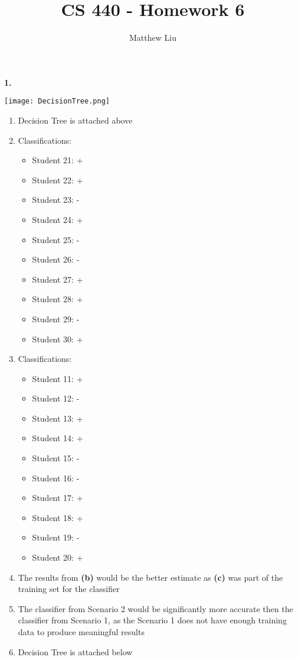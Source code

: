 \documentclass[titlepage]{article}
\title{CS 440 - Homework 6}
\author{Matthew Liu}
\date{}
\begin{document}
\maketitle{}

\noindent \textbf{1. } \\

\centerline{\texttt{[image: DecisionTree.png]}}

\pagebreak

\begin{enumerate}[label=(\alph*)]
	\item Decision Tree is attached above
	\item Classifications:
	\begin{itemize}
		\item Student 21: +
		\item Student 22: +
		\item Student 23: -
		\item Student 24: +
		\item Student 25: -
		\item Student 26: -
		\item Student 27: +
		\item Student 28: +
		\item Student 29: -
		\item Student 30: +
	\end{itemize}
	\item Classifications:
	\begin{itemize}
		\item Student 11: +
		\item Student 12: -
		\item Student 13: +
		\item Student 14: +
		\item Student 15: -
		\item Student 16: -
		\item Student 17: +
		\item Student 18: +
		\item Student 19: -
		\item Student 20: +
	\end{itemize}
	\item The results from \textbf{(b)} would be the better estimate as \textbf{(c)} was part of the training set for the classifier
	\item The classifier from Scenario 2 would be significantly more accurate then the classifier from Scenario 1, as the Scenario 1 does not have enough training data to produce meaningful results
	\item Decision Tree is attached below
\end{enumerate}
\end{document}
